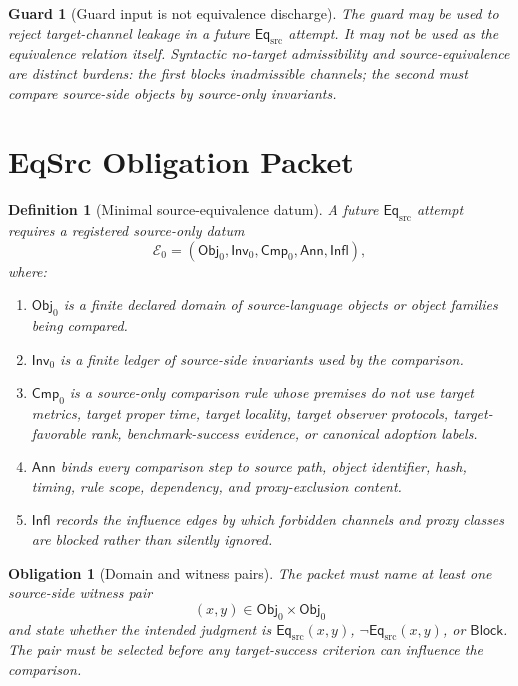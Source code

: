 \documentclass[11pt]{article}
\newcommand{\Obj}{\mathsf{Obj}_{0}}
\newcommand{\Inv}{\mathsf{Inv}_{0}}
\newcommand{\Cmp}{\mathsf{Cmp}_{0}}
\newcommand{\EqSrc}{\mathsf{Eq}_{\mathrm{src}}}
\newcommand{\Annot}{\mathsf{Ann}}
\newcommand{\Influence}{\mathsf{Infl}}
\newcommand{\Block}{\mathsf{Block}}
\newtheorem{definitionblock}{Definition}
\newtheorem{obligation}{Obligation}
\newtheorem{guard}{Guard}
\begin{document}
\begin{guard}[Guard input is not equivalence discharge]
The guard may be used to reject target-channel leakage in a future
\(\EqSrc\) attempt. It may not be used as the equivalence relation itself.
Syntactic no-target admissibility and source-equivalence are distinct
burdens: the first blocks inadmissible channels; the second must compare
source-side objects by source-only invariants.
\end{guard}

\section{EqSrc Obligation Packet}

\begin{definitionblock}[Minimal source-equivalence datum]
A future \(\EqSrc\) attempt requires a registered source-only datum
\[
    \mathcal{E}_{0} = (\Obj,\Inv,\Cmp,\Annot,\Influence),
\]
where:
\begin{enumerate}
    \item \(\Obj\) is a finite declared domain of source-language objects or
    object families being compared.
    \item \(\Inv\) is a finite ledger of source-side invariants used by the
    comparison.
    \item \(\Cmp\) is a source-only comparison rule whose premises do not
    use target metrics, target proper time, target locality, target
    observer protocols, target-favorable rank, benchmark-success evidence,
    or canonical adoption labels.
    \item \(\Annot\) binds every comparison step to source path, object
    identifier, hash, timing, rule scope, dependency, and proxy-exclusion
    content.
    \item \(\Influence\) records the influence edges by which forbidden
    channels and proxy classes are blocked rather than silently ignored.
\end{enumerate}
\end{definitionblock}

\begin{obligation}[Domain and witness pairs]
The packet must name at least one source-side witness pair
\[
    (x,y) \in \Obj \times \Obj
\]
and state whether the intended judgment is \(\EqSrc(x,y)\),
\(\neg\EqSrc(x,y)\), or \(\Block\). The pair must be selected before any
target-success criterion can influence the comparison.
\end{obligation}
\end{document}

